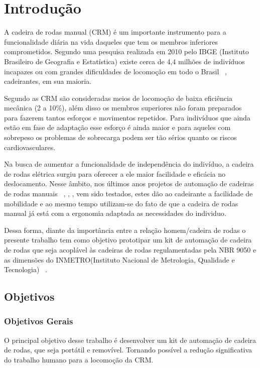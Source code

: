 \chapter[Introdução]{Introdução}

A cadeira de rodas manual (CRM) é um importante instrumento para a funcionalidade diária na vida daqueles que tem os membros inferiores comprometidos. Segundo uma pesquisa realizada em 2010 pelo IBGE (Instituto Brasileiro de Geografia e Estatística) existe cerca de 4,4 milhões de indivíduos incapazes ou com grandes dificuldades de locomoção em todo o Brasil ~\cite{ibge:cartilha:2010}, cadeirantes, em sua maioria.

Segundo \cite{sagawa} as CRM são consideradas meios de locomoção de baixa eficiência mecânica (2 a 10\%), além disso os membros superiores não foram preparados para fazerem tantos esforços e movimentos repetidos. Para indivíduos que ainda estão em fase de adaptação esse esforço é ainda maior e para aqueles com sobrepeso os problemas de sobrecarga podem ser tão sérios quanto os riscos cardiovasculares.

Na busca de aumentar a funcionalidade de independência do indivíduo, a cadeira de rodas elétrica surgiu para oferecer a ele maior facilidade e eficácia no deslocamento. Nesse âmbito, nos últimos anos projetos de automação de cadeiras de rodas manuais ~\cite{brunel:wheelchair:2004}, \cite{artigo_rudi}, \cite{patent_cadeira_rodas_eletrica},	 \cite{marcos:controle:2002}  vem sido testados, estes dão ao cadeirante a facilidade de mobilidade  e ao mesmo tempo utilizam-se do fato de que a cadeira de rodas manual já está com a ergonomia adaptada as necessidades do individuo.

Dessa forma, diante da importância entre a relação homem/cadeira de rodas o presente trabalho tem como objetivo prototipar um kit de automação de cadeira de rodas que seja acoplável às cadeiras de rodas regulamentadas pela NBR 9050 \cite{nbr9050} e as dimensões do INMETRO(Instituto Nacional de Metrologia, Qualidade e Tecnologia) ~\cite{inmetro}.

\section{Objetivos}
\subsection{Objetivos Gerais}

O principal objetivo desse trabalho é desenvolver um kit de automação de cadeira de rodas, que seja portátil e removível. Tornando possível a redução significativa do trabalho humano para a locomoção da CRM.

